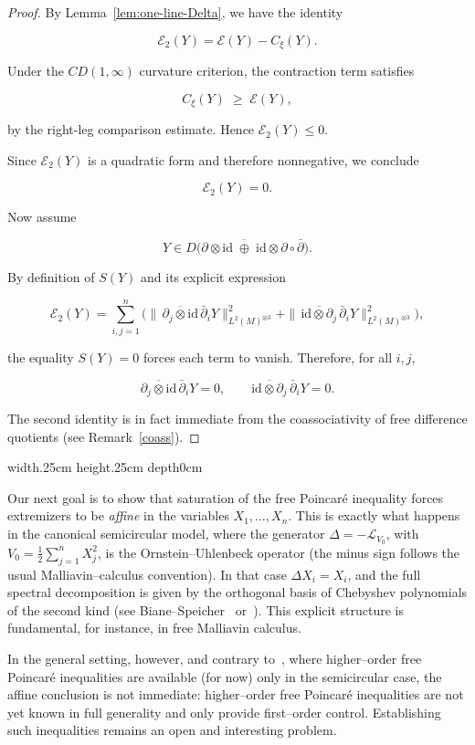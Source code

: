 \documentclass[10pt,a4paper,reqno]{amsart}
\def\qed{ \hfill \vrule width.25cm height.25cm depth0cm\smallskip}
\begin{document}
\begin{proof}
By Lemma~\ref{lem:one-line-Delta}, we have the identity


\[
\mathcal E_2(Y)=\mathcal{E}(Y)-C_\xi(Y).
\]


Under the $CD(1,\infty)$ curvature criterion, the contraction term satisfies


\[
C_\xi(Y)\;\ge\;\mathcal{E}(Y),
\]


by the right-leg comparison estimate. Hence $\mathcal E_2(Y)\le 0$.

Since $\mathcal E_2(Y)$ is a quadratic form and therefore nonnegative, we conclude


\[
\mathcal E_2(Y)=0.
\]



\smallskip

Now assume


\[
Y\in D\!\big(\overline{{\partial}\otimes \mathrm{id}\;\oplus\;\mathrm{id}\otimes{\partial}}\circ\bar\partial \big).
\]


By definition of $S(Y)$ and its explicit expression


\[
 \mathcal E_2(Y)
=
\sum_{i,j=1}^n
\Big(
\|\,\overline{\partial_j\otimes\mathrm{id}}\,\bar\partial_i Y\|_{L^2(M)^{\otimes 3}}^2
+
\|\,\overline{\mathrm{id}\otimes\partial_j}\,\bar\partial_i Y\|_{L^2(M)^{\otimes 3}}^2
\Big),
\]


the equality $S(Y)=0$ forces each term to vanish. Therefore, for all $i,j$,


\[
\overline{\partial_j\otimes \mathrm{id}}\,\bar\partial_i Y=0,
\qquad
\overline{\mathrm{id}\otimes \partial_j}\,\bar\partial_i Y=0.
\]



The second identity is in fact immediate from the coassociativity of free difference quotients
(see Remark~\ref{coass}).
\end{proof}
\qed
\begin{flushleft}
Our next goal is to show that saturation of the free Poincaré inequality forces extremizers to be \emph{affine} in the variables \(X_1,\ldots,X_n\). This is exactly what happens in the canonical semicircular model, where the generator \(\Delta=-\mathcal{L}_{V_0}\), with \(V_0=\tfrac12\sum_{j=1}^n X_j^2\), is the Ornstein--Uhlenbeck operator (the minus sign follows the usual Malliavin–calculus convention). In that case \(\Delta X_i=X_i\), and the full spectral decomposition is given by the orthogonal basis of Chebyshev polynomials of the second kind (see Biane--Speicher~\cite{BS} or~\cite{Di2}). This explicit structure is fundamental, for instance, in free Malliavin calculus.

In the general setting, however, and contrary to~\cite[Proposition~3]{Di3}, where higher--order free Poincaré inequalities are available (for now) only in the semicircular case, the affine conclusion is not immediate: higher--order free Poincaré inequalities are not yet known in full generality and only provide first--order control. Establishing such inequalities remains an open and interesting problem.
\end{flushleft}
\end{document}
